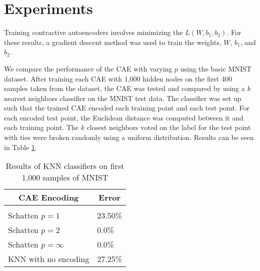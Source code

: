 \documentclass{article} %
\begin{document}

\section{Experiments}

Training contractive autoencoders involves minimizing the $L(W, b_1, b_2)$. For these results, a gradient descent method was used to train the weights, $W$, $b_1$, and $b_2$.

We compare the performance of the CAE with varying $p$ using the basic MNIST dataset. After training each CAE with 1,000 hidden nodes on the first 400 samples taken from the dataset, the CAE was tested and compared by using a $k$ nearest neighbors classifier on the MNIST test data. The classifier was set up such that the trained CAE encoded each training point and each test point. For each encoded test point, the Euclidean distance was computed between it and each training point. The $k$ closest neighbors voted on the label for the test point with ties were broken randomly using a uniform distribution. Results can be seen in Table \ref{knn-table}.

\begin{table}[t]
\caption{Results of KNN classifiers on first 1,000 samples of MNIST}
\label{knn-table}
\begin{center}
\begin{tabular}{ll}
\multicolumn{1}{c}{\bf CAE Encoding} & \multicolumn{1}{c}{\bf Error}
\\ \hline \\
Schatten $p=1$         	&	23.50\% \\
Schatten $p=2$          &	0.0\% \\
Schatten $p=\infty$     &	0.0\% \\
KNN with no encoding		& 27.25\% \\
\end{tabular}
\end{center}
\end{table}

\end{document}
